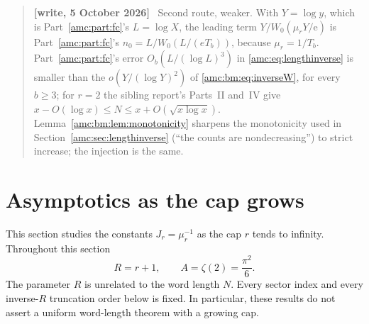 \documentclass[11pt,letterpaper]{article}
\theoremstyle{remark}\newtheorem{remark}[theorem]{Remark}
\newcommand{\ee}{\mathrm e}
\newenvironment{writenotedated}[1]{\par\smallskip\begin{quote}\small\textbf{[write, #1]}\ }{\end{quote}\smallskip}
\begin{document}
\begin{writenotedated}{5 October 2026}
Second route, weaker. With $Y=\log y$, which is Part~\ref{amc:part:fc}'s $L=\log X$, the leading term $Y/W_0(\mu_rY/\ee)$ is Part~\ref{amc:part:fc}'s $n_0=L/W_0(L/(eT_b))$, because $\mu_r=1/T_b$. Part~\ref{amc:part:fc}'s error $O_b(L/(\log L)^3)$ in \eqref{amc:eq:lengthinverse} is smaller than the $o(Y/(\log Y)^2)$ of \eqref{amc:bm:eq:inverseW}, for every $b\ge3$; for $r=2$ the sibling report's Parts~II and~IV give $x-O(\log x)\le N\le x+O(\sqrt{x\log x})$. Lemma~\ref{amc:bm:lem:monotonicity} sharpens the monotonicity used in Section~\ref{amc:sec:lengthinverse} (``the counts are nondecreasing'') to strict increase; the injection is the same.
\end{writenotedated}

\section{Asymptotics as the cap grows}\label{amc:bm:sec:largecap}

This section studies the constants $J_r=\mu_r^{-1}$ as the cap $r$ tends to infinity. Throughout this section
\[
 R=r+1,\qquad A=\zeta(2)=\frac{\pi^2}{6}.
\]
The parameter $R$ is unrelated to the word length $N$. Every sector index and every inverse-$R$ truncation order below is fixed. In particular, these results do not assert a uniform word-length theorem with a growing cap.
\end{document}

